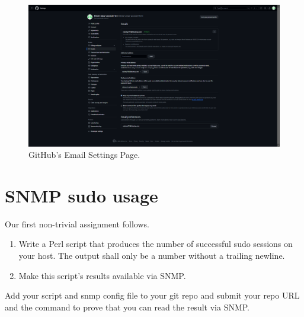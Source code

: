 \documentclass{article}
\begin{document}
\begin{figure}[p]
	\centering
	\includegraphics[width=\textwidth]{noreply-email.png}
	\caption{GitHub's Email Settings Page.}
	\label{fig:noreply-email}
\end{figure}

\clearpage



\section{SNMP sudo usage}

Our first non-trivial assignment follows. %

\begin{enumerate}

	\item

		Write a Perl script that produces the number of successful sudo
		sessions on your host. The output shall only be a number without
		a trailing newline.

	\item Make this script's results available via SNMP.

\end{enumerate}
%
Add your script and snmp config file to your git repo and submit your repo URL
and the command to prove that you can read the result via SNMP.
\end{document}
